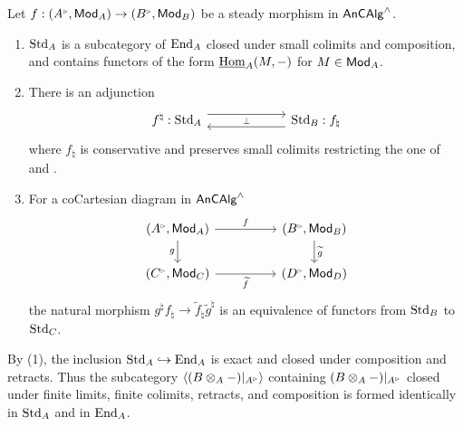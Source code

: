 \begin{proposition}\label{prop: properties of steady endofunctors}
    Let $f:(A^{\tri},\Mod_{A})\to (B^{\tri},\Mod_{B})$ be a steady morphism in $\mathsf{An}\mathsf{CAlg}^{\wedge}$. 
    \begin{enumerate}
        \item $\mathrm{Std}_{A}$ is a subcategory of $\mathrm{End}_{A}$ closed under small colimits and composition, and contains functors of the form $\underline{\mathrm{Hom}}_{A}(M,-)$ for $M\in\mathsf{Mod}_{A}$. 
        \item There is an adjunction 
        $$%
        \begin{tikzcd}
            {f^{\natural}:\Std_{A}} & \mperp & {\Std_{B}:f_{\natural}}
            \arrow[shift left=2, from=1-1, to=1-3]
            \arrow[shift left=2, from=1-3, to=1-1]
        \end{tikzcd}$$
        where $f_{\natural}$ is conservative and preserves small colimits restricting the one of  and . 
        \item For a coCartesian diagram in $\mathsf{An}\mathsf{CAlg}^{\wedge}$
        $$%
        \begin{tikzcd}
            {(A^{\tri},\Mod_{A})} && {(B^{\tri},\Mod_{B})} \\
            {(C^{\tri},\Mod_{C})} && {(D^{\tri},\Mod_{D})}
            \arrow["f", from=1-1, to=1-3]
            \arrow["g"', from=1-1, to=2-1]
            \arrow["{\widetilde{g}}", from=1-3, to=2-3]
            \arrow["{\widetilde{f}}"', from=2-1, to=2-3]
        \end{tikzcd}$$
        the natural morphism $g^{\natural}f_{\natural}\to\widetilde{f}_{\natural}\widetilde{g}^{\natural}$ is an equivalence of functors from $\mathrm{Std}_{B}$ to $\mathrm{Std}_{C}$. 
    \end{enumerate}
\end{proposition}
\begin{remark}\label{rmk: equivalently in enriched endofunctors}
    By  (1), the inclusion $\mathrm{Std}_{A}\hookrightarrow\mathrm{End}_{A}$ is exact and closed under composition and retracts. Thus the subcategory $\langle(B\otimes_{A}-)|_{A^{\tri}}\rangle$ containing $(B\otimes_{A}-)|_{A^{\tri}}$ closed under finite limits, finite colimits, retracts, and composition is formed identically in $\mathrm{Std}_{A}$ and in $\mathrm{End}_{A}$.
\end{remark}
